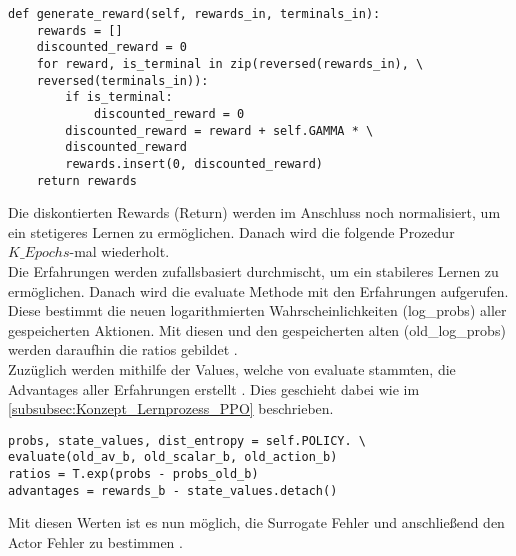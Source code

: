 \begin{lstlisting}[caption=Diskontierung der Rewards, label=code:Diskontierung_Rewards, style=Python]
def generate_reward(self, rewards_in, terminals_in):
	rewards = []
	discounted_reward = 0
	for reward, is_terminal in zip(reversed(rewards_in), \
	reversed(terminals_in)):
		if is_terminal:
			discounted_reward = 0
		discounted_reward = reward + self.GAMMA * \
		discounted_reward
		rewards.insert(0, discounted_reward)
	return rewards
\end{lstlisting}
Die diskontierten Rewards (Return) werden im Anschluss noch normalisiert, um ein stetigeres Lernen zu ermöglichen.
Danach wird die folgende Prozedur $K\_Epochs$-mal wiederholt.\\
Die Erfahrungen werden zufallsbasiert durchmischt, um ein stabileres Lernen zu ermöglichen. 
Danach wird die evaluate Methode mit den Erfahrungen aufgerufen. Diese bestimmt die neuen logarithmierten Wahrscheinlichkeiten (log\_probs) aller gespeicherten Aktionen. Mit diesen und den gespeicherten alten (old\_log\_probs) werden daraufhin die ratios  gebildet .\\
Zuzüglich werden mithilfe der Values, welche von evaluate stammten, die Advantages aller Erfahrungen erstellt . Dies geschieht dabei wie im \autoref{subsubsec:Konzept_Lernprozess_PPO} beschrieben.
\begin{lstlisting}[caption=Bestimmung der Ratios und Advantages, label=code:Bestimmung_Ratio_Advantages, style=Python]
probs, state_values, dist_entropy = self.POLICY. \
evaluate(old_av_b, old_scalar_b, old_action_b)	
ratios = T.exp(probs - probs_old_b)	
advantages = rewards_b - state_values.detach()
\end{lstlisting}
Mit diesen Werten ist es nun möglich, die Surrogate Fehler  und anschließend den Actor Fehler zu bestimmen .

